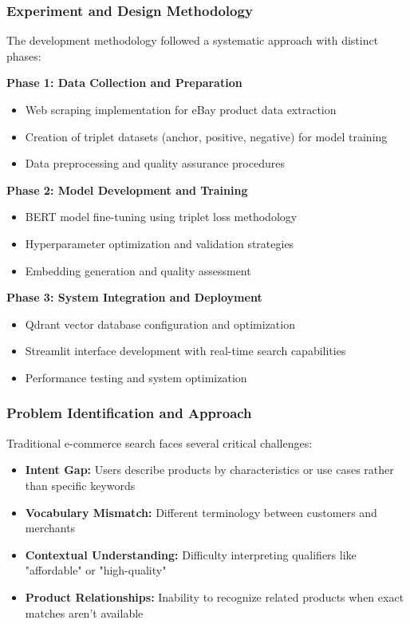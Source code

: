 \documentclass[12pt,a4paper]{article}
\begin{document}
\subsubsection{Experiment and Design Methodology}
The development methodology followed a systematic approach with distinct phases:

\textbf{Phase 1: Data Collection and Preparation}
\begin{itemize}
    \item Web scraping implementation for eBay product data extraction
    \item Creation of triplet datasets (anchor, positive, negative) for model training
    \item Data preprocessing and quality assurance procedures
\end{itemize}

\textbf{Phase 2: Model Development and Training}
\begin{itemize}
    \item BERT model fine-tuning using triplet loss methodology
    \item Hyperparameter optimization and validation strategies
    \item Embedding generation and quality assessment
\end{itemize}

\textbf{Phase 3: System Integration and Deployment}
\begin{itemize}
    \item Qdrant vector database configuration and optimization
    \item Streamlit interface development with real-time search capabilities
    \item Performance testing and system optimization
\end{itemize}

\subsubsection{Problem Identification and Approach}
Traditional e-commerce search faces several critical challenges:
\begin{itemize}
    \item \textbf{Intent Gap:} Users describe products by characteristics or use cases rather than specific keywords
    \item \textbf{Vocabulary Mismatch:} Different terminology between customers and merchants
    \item \textbf{Contextual Understanding:} Difficulty interpreting qualifiers like "affordable" or "high-quality"
    \item \textbf{Product Relationships:} Inability to recognize related products when exact matches aren't available
\end{itemize}
\end{document}
